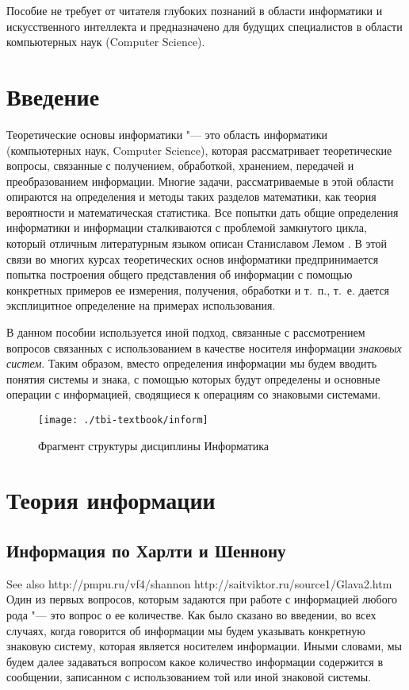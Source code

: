 \documentclass[b5paper,11pt]{book}
\begin{document}
	Пособие не требует от читателя глубоких познаний в области информатики и искусственного интеллекта и предназначено для будущих специалистов в области компьютерных наук (Computer Science).
	
	
	\tableofcontents %
		
	\chapter*{Введение}
	Теоретические основы информатики "--- это область информатики (компьютерных наук, Computer Science), которая рассматривает теоретические вопросы, связанные с получением, обработкой, хранением, передачей и преобразованием информации. Многие задачи, рассматриваемые в этой области опираются на определения и методы таких разделов математики, как теория вероятности и математическая статистика. Все попытки дать общие определения информатики и информации сталкиваются с проблемой замкнутого цикла, который отличным литературным языком описан Станиславом Лемом \cite{Lem2015}. В этой связи во многих курсах теоретических основ информатики предпринимается попытка построения общего представления об информации с помощью конкретных примеров ее измерения, получения, обработки и т.~п., т.~е. дается эксплицитное определение на примерах использования. 
	
	В данном пособии используется иной подход, связанные с рассмотрением вопросов связанных с использованием в качестве носителя информации \textit{знаковых систем}. Таким образом, вместо определения информации мы будем вводить понятия системы и знака, с помощью которых будут определены и основные операции с информацией, сводящиеся к операциям со знаковыми системами.
	
	\begin{figure}[h]
		\centering
		\texttt{[image: ./tbi-textbook/inform]}
		\caption{Фрагмент структуры дисциплины Информатика}
	\end{figure}
	
	
	\chapter{Теория информации}
	
	\section{Информация по Харлти и Шеннону}
	See also http://pmpu.ru/vf4/shannon
http://saitviktor.ru/source1/Glava2.htm
	Один из первых вопросов, которым задаются при работе с информацией любого рода "--- это вопрос о ее количестве. Как было сказано во введении, во всех случаях, когда говорится об информации мы будем указывать конкретную знаковую систему, которая является носителем информации. Иными словами, мы будем далее задаваться вопросом какое количество информации содержится в сообщении, записанном с использованием той или иной знаковой системы.
	
\end{document}
